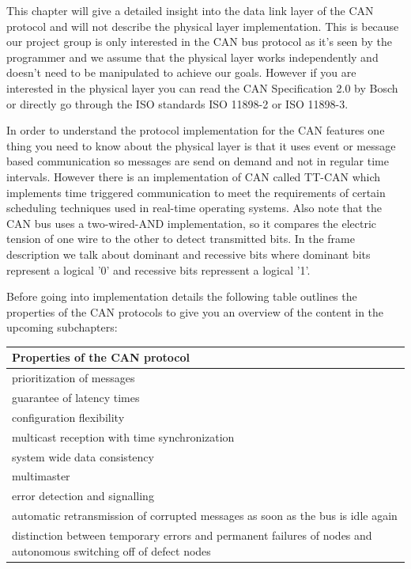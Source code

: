 This chapter will give a detailed insight into the data link layer of the CAN
protocol and will not describe the physical layer implementation. This is
because our project group is only interested in the CAN bus protocol as it's
seen by the programmer and we assume that the physical layer works independently
and doesn't need to be manipulated to achieve our goals. However if you are
interested in the physical layer you can read the CAN Specification
2.0\cite{can2spec} by Bosch or directly go through the ISO standards ISO 11898-2\cite{iso11898-2} or ISO
11898-3\cite{iso11898-3}.

In order to understand the protocol implementation for the CAN features one
thing you need to know about the physical layer is that it uses event or message
based communication so messages are send on demand and not in regular time
intervals. However there is an implementation of CAN called
TT-CAN\cite{iso11898-4} which implements time triggered communication to meet
the requirements of certain scheduling techniques used in real-time operating systems.
Also note that the CAN bus uses a two-wired-AND implementation, so it compares
the electric tension of one wire to the other to detect transmitted bits. In the
frame description we talk about dominant and recessive bits where dominant bits
represent a logical '0' and recessive bits repressent a logical '1'.

Before going into implementation details the following table outlines the
properties of the CAN protocols to give you an overview of the content in the
upcoming subchapters:

\begin{center}
    \begin{tabular}{ | p{35em} |}
    \hline
    \rowcolor{lightgray} Properties of the CAN protocol \\ \hline
    prioritization of messages \\ \hline
    guarantee of latency times \\ \hline
    configuration flexibility \\ \hline
    multicast reception with time synchronization \\ \hline
    system wide data consistency \\ \hline
    multimaster \\ \hline
    error detection and signalling \\ \hline
    automatic retransmission of corrupted messages as soon as the bus is idle
    again \\ \hline 
    distinction between temporary errors and permanent
    failures of nodes and autonomous switching off of defect nodes\\
    \hline
    \end{tabular}
\end{center}

